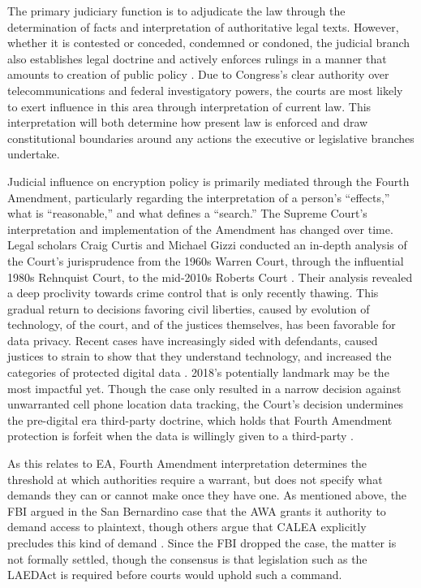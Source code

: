 The primary judiciary function is to adjudicate the law through the determination of facts and interpretation of
authoritative legal texts. However, whether it is contested or conceded, condemned or condoned, the judicial branch also
establishes legal doctrine and actively enforces rulings in a manner that amounts to creation of public policy
\cite{feeley_judicial_2000}. Due to Congress's clear authority over telecommunications and federal investigatory powers,
the courts are most likely to exert influence in this area through interpretation of current law. This interpretation
will both determine how present law is enforced and draw constitutional boundaries around any actions the executive or
legislative branches undertake.

Judicial influence on encryption policy is primarily mediated through the Fourth Amendment, particularly regarding the
interpretation of a person's ``effects,'' what is ``reasonable,'' and what defines a ``search.'' The Supreme Court's
interpretation and implementation of the Amendment has changed over time. Legal scholars Craig Curtis and Michael Gizzi
conducted an in-depth analysis of the Court's jurisprudence from the 1960s Warren Court, through the influential 1980s
Rehnquist Court, to the mid-2010s Roberts Court \cite{gizzi_fourth_2016}. Their analysis revealed a deep proclivity
towards crime control that is only recently thawing. This gradual return to decisions favoring civil liberties, caused
by evolution of technology, of the court, and of the justices themselves, has been favorable for data privacy. Recent
cases have increasingly sided with defendants, caused justices to strain to show that they understand technology, and
increased the categories of protected digital data \cite{gizzi_fourth_2016}. 2018's potentially landmark  may be the most impactful yet. Though the case only resulted in a narrow decision against unwarranted
cell phone location data tracking, the Court's decision undermines the pre-digital era third-party doctrine, which holds
that Fourth Amendment protection is forfeit when the data is willingly given to a third-party \cite{franklin_2018}.

As this relates to \ac{EA}, Fourth Amendment interpretation determines the threshold at which authorities require a
warrant, but does not specify what demands they can or cannot make once they have one. As mentioned above, the FBI
argued in the San Bernardino case that the \ac{AWA} grants it authority to demand access to \ac{plaintext}, though
others argue that \acs{CALEA} explicitly precludes this kind of demand \cite{gidari_2016}. Since the FBI dropped the
case, the matter is not formally settled, though the consensus is that legislation such as the \ac{LAEDAct} is required
before courts would uphold such a command.

